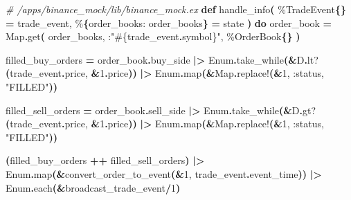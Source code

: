 \documentclass[
  oneside]{book}
\newenvironment{Shaded}{\begin{snugshade}}{\end{snugshade}}
\newcommand{\CommentTok}[1]{\textcolor[rgb]{0.56,0.35,0.01}{\textit{#1}}}
\newcommand{\ConstantTok}[1]{\textcolor[rgb]{0.56,0.35,0.01}{#1}}
\newcommand{\DecValTok}[1]{\textcolor[rgb]{0.00,0.00,0.81}{#1}}
\newcommand{\FunctionTok}[1]{\textcolor[rgb]{0.13,0.29,0.53}{\textbf{#1}}}
\newcommand{\KeywordTok}[1]{\textcolor[rgb]{0.13,0.29,0.53}{\textbf{#1}}}
\newcommand{\NormalTok}[1]{#1}
\newcommand{\OperatorTok}[1]{\textcolor[rgb]{0.81,0.36,0.00}{\textbf{#1}}}
\newcommand{\OtherTok}[1]{\textcolor[rgb]{0.56,0.35,0.01}{#1}}
\newcommand{\StringTok}[1]{\textcolor[rgb]{0.31,0.60,0.02}{#1}}
\newcommand{\VariableTok}[1]{\textcolor[rgb]{0.00,0.00,0.00}{#1}}
\begin{document}
\begin{Shaded}
\begin{Highlighting}[]
\CommentTok{\# /apps/binance\_mock/lib/binance\_mock.ex}
  \KeywordTok{def}\NormalTok{ handle\_info}\FunctionTok{(}
\NormalTok{        \%}\ConstantTok{TradeEvent}\FunctionTok{\{\}} \OperatorTok{=}\NormalTok{ trade\_event,}
\NormalTok{        \%}\FunctionTok{\{}\VariableTok{order\_books:}\NormalTok{ order\_books}\FunctionTok{\}} \OperatorTok{=}\NormalTok{ state}
      \FunctionTok{)} \KeywordTok{do}
\NormalTok{    order\_book }\OperatorTok{=}
      \ConstantTok{Map}\OperatorTok{.}\NormalTok{get}\FunctionTok{(}
\NormalTok{        order\_books,}
\NormalTok{        :}\StringTok{"}\OtherTok{\#\{}\NormalTok{trade\_event}\OperatorTok{.}\NormalTok{symbol}\OtherTok{\}}\StringTok{"}\NormalTok{,}
\NormalTok{        \%}\ConstantTok{OrderBook}\FunctionTok{\{\}}
      \FunctionTok{)}

\NormalTok{    filled\_buy\_orders }\OperatorTok{=}
\NormalTok{      order\_book}\OperatorTok{.}\NormalTok{buy\_side}
      \OperatorTok{|\textgreater{}} \ConstantTok{Enum}\OperatorTok{.}\NormalTok{take\_while}\FunctionTok{(}\OperatorTok{\&}\NormalTok{D}\OperatorTok{.}\NormalTok{lt?}\FunctionTok{(}\NormalTok{trade\_event}\OperatorTok{.}\NormalTok{price, }\OperatorTok{\&}\DecValTok{1}\OperatorTok{.}\NormalTok{price}\FunctionTok{))}
      \OperatorTok{|\textgreater{}} \ConstantTok{Enum}\OperatorTok{.}\NormalTok{map}\FunctionTok{(}\OperatorTok{\&}\ConstantTok{Map}\OperatorTok{.}\NormalTok{replace!}\FunctionTok{(}\OperatorTok{\&}\DecValTok{1}\NormalTok{, }\VariableTok{:status}\NormalTok{, }\StringTok{"FILLED"}\FunctionTok{))}

\NormalTok{    filled\_sell\_orders }\OperatorTok{=}
\NormalTok{      order\_book}\OperatorTok{.}\NormalTok{sell\_side}
      \OperatorTok{|\textgreater{}} \ConstantTok{Enum}\OperatorTok{.}\NormalTok{take\_while}\FunctionTok{(}\OperatorTok{\&}\NormalTok{D}\OperatorTok{.}\NormalTok{gt?}\FunctionTok{(}\NormalTok{trade\_event}\OperatorTok{.}\NormalTok{price, }\OperatorTok{\&}\DecValTok{1}\OperatorTok{.}\NormalTok{price}\FunctionTok{))}
      \OperatorTok{|\textgreater{}} \ConstantTok{Enum}\OperatorTok{.}\NormalTok{map}\FunctionTok{(}\OperatorTok{\&}\ConstantTok{Map}\OperatorTok{.}\NormalTok{replace!}\FunctionTok{(}\OperatorTok{\&}\DecValTok{1}\NormalTok{, }\VariableTok{:status}\NormalTok{, }\StringTok{"FILLED"}\FunctionTok{))}

    \FunctionTok{(}\NormalTok{filled\_buy\_orders }\OperatorTok{++}\NormalTok{ filled\_sell\_orders}\FunctionTok{)}
    \OperatorTok{|\textgreater{}} \ConstantTok{Enum}\OperatorTok{.}\NormalTok{map}\FunctionTok{(}\OperatorTok{\&}\NormalTok{convert\_order\_to\_event}\FunctionTok{(}\OperatorTok{\&}\DecValTok{1}\NormalTok{, trade\_event}\OperatorTok{.}\NormalTok{event\_time}\FunctionTok{))}
    \OperatorTok{|\textgreater{}} \ConstantTok{Enum}\OperatorTok{.}\NormalTok{each}\FunctionTok{(}\OperatorTok{\&}\NormalTok{broadcast\_trade\_event}\OperatorTok{/}\DecValTok{1}\FunctionTok{)}


\end{Highlighting}
\end{Shaded}
\end{document}
